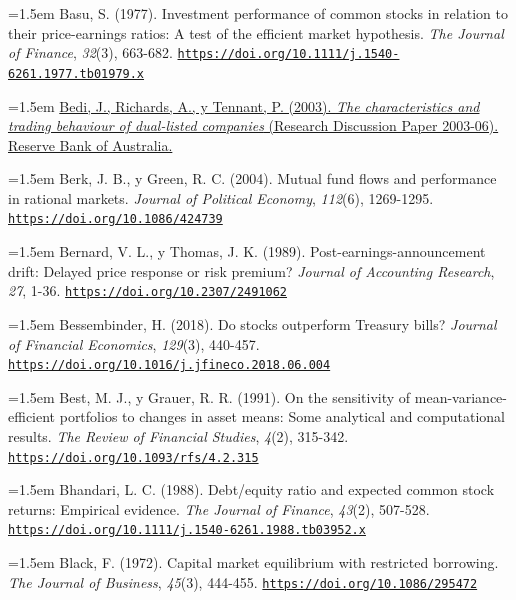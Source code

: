 \documentclass[10pt,a4paper]{article}
\begin{document}
\noindent\hangindent=1.5em Basu, S. (1977). Investment performance of common stocks in relation to their price-earnings ratios: A test of the efficient market hypothesis. \textit{The Journal of Finance}, \textit{32}(3), 663-682. \href{https://doi.org/10.1111/j.1540-6261.1977.tb01979.x}{\nolinkurl{https://doi.org/10.1111/j.1540-6261.1977.tb01979.x}}

\noindent\hangindent=1.5em \href{https://www.rba.gov.au/publications/rdp/2003/pdf/rdp2003-06.pdf}{Bedi, J., Richards, A., y Tennant, P. (2003). \textit{The characteristics and trading behaviour of dual-listed companies} (Research Discussion Paper 2003-06). Reserve Bank of Australia.}

\noindent\hangindent=1.5em Berk, J. B., y Green, R. C. (2004). Mutual fund flows and performance in rational markets. \textit{Journal of Political Economy}, \textit{112}(6), 1269-1295. \href{https://doi.org/10.1086/424739}{\nolinkurl{https://doi.org/10.1086/424739}}

\noindent\hangindent=1.5em Bernard, V. L., y Thomas, J. K. (1989). Post-earnings-announcement drift: Delayed price response or risk premium? \textit{Journal of Accounting Research}, \textit{27}, 1-36. \href{https://doi.org/10.2307/2491062}{\nolinkurl{https://doi.org/10.2307/2491062}}

\noindent\hangindent=1.5em Bessembinder, H. (2018). Do stocks outperform Treasury bills? \textit{Journal of Financial Economics}, \textit{129}(3), 440-457. \href{https://doi.org/10.1016/j.jfineco.2018.06.004}{\nolinkurl{https://doi.org/10.1016/j.jfineco.2018.06.004}}

\noindent\hangindent=1.5em Best, M. J., y Grauer, R. R. (1991). On the sensitivity of mean-variance-efficient portfolios to changes in asset means: Some analytical and computational results. \textit{The Review of Financial Studies}, \textit{4}(2), 315-342. \href{https://doi.org/10.1093/rfs/4.2.315}{\nolinkurl{https://doi.org/10.1093/rfs/4.2.315}}

\noindent\hangindent=1.5em Bhandari, L. C. (1988). Debt/equity ratio and expected common stock returns: Empirical evidence. \textit{The Journal of Finance}, \textit{43}(2), 507-528. \href{https://doi.org/10.1111/j.1540-6261.1988.tb03952.x}{\nolinkurl{https://doi.org/10.1111/j.1540-6261.1988.tb03952.x}}

\noindent\hangindent=1.5em Black, F. (1972). Capital market equilibrium with restricted borrowing. \textit{The Journal of Business}, \textit{45}(3), 444-455. \href{https://doi.org/10.1086/295472}{\nolinkurl{https://doi.org/10.1086/295472}}
\end{document}
